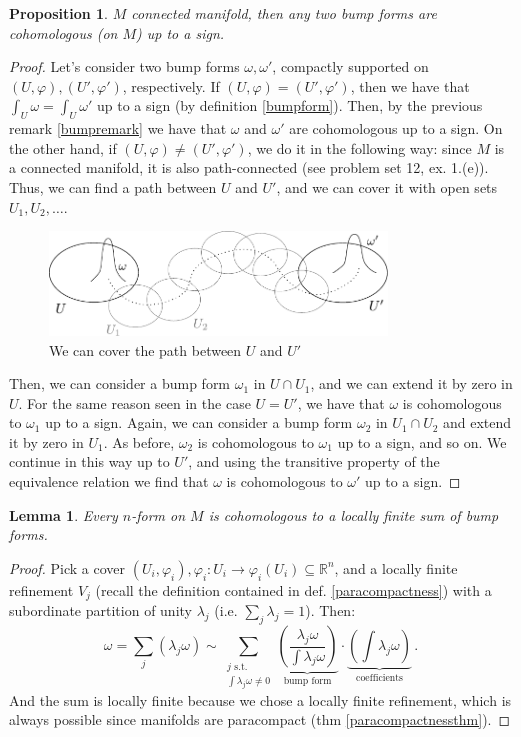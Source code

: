 \documentclass[a4paper,11pt,titlepage, article, oneside]{memoir}
\numberwithin{equation}{section}
\newtheorem{proposition}[theorem]{Proposition}
\newtheorem{lemma}[theorem]{Lemma}
\theoremstyle{definition}
\theoremstyle{remark}
\newcommand{\rfield}{\mathbb{R}}
\begin{document}
\begin{proposition} \label{prop2bumpforms}
$M$ connected manifold, then any two bump forms are cohomologous (on $M$) up to a sign.
\end{proposition}
\begin{proof}
Let's consider two bump forms $\omega, \omega'$, compactly supported on $(U, \varphi), (U', \varphi')$, respectively. If $(U, \varphi) = (U', \varphi')$, then we have that $\int_U \omega = \int_U \omega'$ up to a sign (by definition \ref{bumpform}). Then, by the previous remark \ref{bumpremark} we have that $\omega$ and $\omega'$ are cohomologous up to a sign. On the other hand, if $(U, \varphi) \not = (U', \varphi')$, we do it in the following way: since $M$ is a connected manifold, it is also path-connected (see problem set 12, ex. 1.(e)). Thus, we can find a path between $U$ and $U'$, and we can cover it with open sets $U_1, U_2, \ldots$.
\begin{figure}[H] \label{Fig:bumpforms1}
     \centering
     \includegraphics[width=0.8\textwidth]{Images/bumpforms1.pdf} 
     \caption{We can cover the path between $U$ and $U'$}      
\end{figure}
Then, we can consider a bump form $\omega_1$ in $U \cap U_1$, and we can extend it by zero in $U$. For the same reason seen in the case $U=U'$, we have that $\omega$ is cohomologous to $\omega_1$ up to a sign. Again, we can consider a bump form $\omega_2$ in $U_1 \cap U_2$ and extend it by zero in $U_1$. As before, $\omega_2$ is cohomologous to $\omega_1$ up to a sign, and so on. We continue in this way up to $U'$, and using the transitive property of the equivalence relation we find that $\omega$ is cohomologous to $\omega'$ up to a sign.
\end{proof}

\begin{lemma} \label{lemmalocfinite}
Every $n$-form on $M$ is cohomologous to a locally finite sum of bump forms.
\end{lemma}
\begin{proof}
Pick a cover $(U_i, \varphi_i), \varphi_i \colon U_i \rightarrow \varphi_i(U_i) \subseteq \rfield^n$, and a locally finite refinement $V_j$ (recall the definition contained in def. \ref{paracompactness}) with a subordinate partition of unity $\lambda_j$ (i.e. $\sum_j \lambda_j = 1$). Then:
\[ \omega = \sum\limits_j (\lambda_j \omega) \sim \sum\limits_{\substack{j \text{ s.t. } \\ \int \lambda_j \omega \not = 0}} \underbrace{\left( \frac{\lambda_j \omega}{\int \lambda_j \omega} \right)}_{\text{bump form}} \cdot \underbrace{\left ( \int \lambda_j \omega \right )}_{\text{coefficients}}  \, .\]
And the sum is locally finite because we chose a locally finite refinement, which is always possible since manifolds are paracompact (thm \ref{paracompactnessthm}).
\end{proof}
\end{document}
